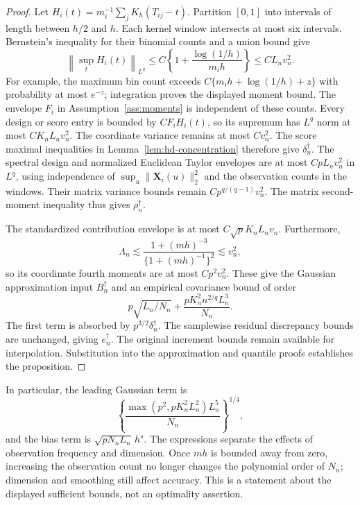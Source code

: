 \documentclass[12pt]{article}
\newcommand{\bX}{{\mathbf X}}
\numberwithin{equation}{section}
\begin{document}
\begin{proof}
Let $H_i(t)=m_i^{-1}\sum_jK_h(T_{ij}-t)$.
Partition $[0,1]$ into intervals of length between $h/2$ and $h$.
Each kernel window intersects at most six intervals. Bernstein's inequality
for their binomial counts and a union bound give
\[
\left\|\sup_t H_i(t)\right\|_{L^q}
\le C\left\{1+\frac{\log(1/h)}{m_i h}\right\}
\le CL_n v_n^2.
\]
For example, the maximum bin count exceeds
$C\{m_i h+\log(1/h)+z\}$ with probability at most $e^{-z}$;
integration proves the displayed moment bound.
The envelope $F_i$ in Assumption~\ref{ass:moments} is independent of these
counts. Every design or score entry is bounded by $CF_i H_i(t)$, so its
supremum has $L^q$ norm at most $CK_nL_n v_n^2$.
The coordinate variance remains at most $Cv_n^2$.
The score maximal inequalities in Lemma~\ref{lem:hd-concentration}
therefore give $\delta_n^\dagger$. The spectral design and normalized
Euclidean Taylor envelopes are at most $CpL_n v_n^2$ in $L^q$,
using independence of $\sup_u\|\bX_i(u)\|_2^2$ and the observation
counts in the windows. Their matrix variance bounds remain
$Cp^{q/(q-1)}v_n^2$.
The matrix second-moment inequality thus gives $\rho_n^\dagger$.

The standardized contribution envelope is at most
$C\sqrt pK_nL_n v_n$. Furthermore,
\[
\Lambda_n\lesssim
\frac{1+(mh)^{-3}}{\{1+(mh)^{-1}\}^2}\lesssim v_n^2,
\]
so its coordinate fourth moments are at most $Cp^2v_n^2$.
These give the Gaussian approximation input $B_n^\dagger$ and
an empirical covariance bound of order
\[
p\sqrt{L_n/N_n}+\frac{pK_n^2n^{2/q}L_n^3}{N_n}.
\]
The first term is absorbed by $p^{3/2}\delta_n^\dagger$.
The samplewise residual discrepancy bounds are unchanged, giving
$e_n^\dagger$. The original increment
bounds remain available for interpolation. Substitution into the approximation and quantile proofs
establishes the proposition.
\end{proof}

In particular, the leading Gaussian term is
\[
\left\{\frac{\max(p^2,pK_n^2L_n^2)L_n^5}{N_n}\right\}^{1/4},
\]
and the bias term is $\sqrt{pN_nL_n}\,h^s$.
The expressions separate the effects of observation frequency and dimension.
Once $mh$ is bounded away from zero, increasing the observation count no
longer changes the polynomial order of $N_n$; dimension and smoothing still
affect accuracy. This is a statement about the displayed sufficient bounds,
not an optimality assertion.
\end{document}
